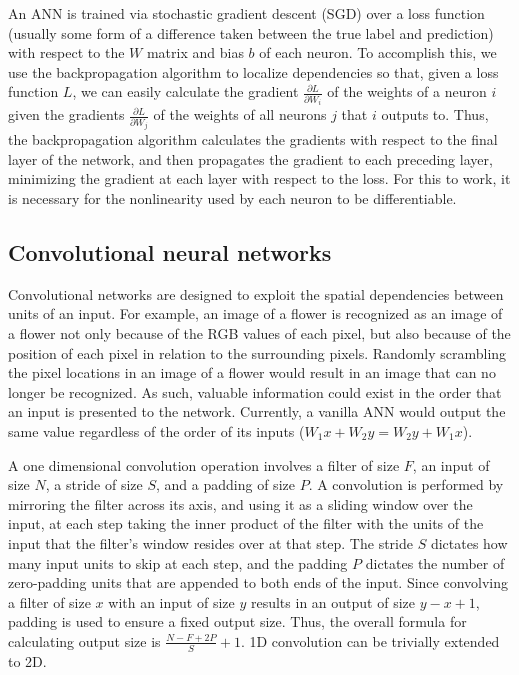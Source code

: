 \documentclass{article} %
\begin{document}
An ANN is trained via stochastic gradient descent (SGD) over a loss function (usually some form of a difference taken between the true label and prediction) with respect to the $W$ matrix and bias $b$ of each neuron. To accomplish this, we use the backpropagation algorithm to localize dependencies so that, given a loss function $L$, we can easily calculate the gradient $\frac{\partial L}{\partial W_{i}}$ of the weights of a neuron $i$ given the gradients $\frac{\partial L}{\partial W_{j}}$ of the weights of all neurons $j$ that $i$ outputs to. Thus, the backpropagation algorithm calculates the gradients with respect to the final layer of the network, and then propagates the gradient to each preceding layer, minimizing the gradient at each layer with respect to the loss. For this to work, it is necessary for the nonlinearity used by each neuron to be differentiable. 

\subsection{Convolutional neural networks}
Convolutional networks are designed to exploit the spatial dependencies between units of an input. For example, an image of a flower is recognized as an image of a flower not only because of the RGB values of each pixel, but also because of the position of each pixel in relation to the surrounding pixels. Randomly scrambling the pixel locations in an image of a flower would result in an image that can no longer be recognized. As such, valuable information could exist in the order that an input is presented to the network. Currently, a vanilla ANN would output the same value regardless of the order of its inputs ($W_{1}x+W_{2}y = W_{2}y+W_{1}x$). 

A one dimensional convolution operation involves a filter of size $F$, an input of size $N$, a stride of size $S$, and a padding of size $P$. A convolution is performed by mirroring the filter across its axis, and using it as a sliding window over the input, at each step taking the inner product of the filter with the units of the input that the filter's window resides over at that step. The stride $S$ dictates how many input units to skip at each step, and the padding $P$ dictates the number of zero-padding units that are appended to both ends of the input. Since convolving a filter of size $x$ with an input of size $y$ results in an output of size $y-x+1$, padding is used to ensure a fixed output size. Thus, the overall formula for calculating output size is $\frac{N-F+2P}{S}+1$. 1D convolution can be trivially extended to 2D. 
\end{document}
